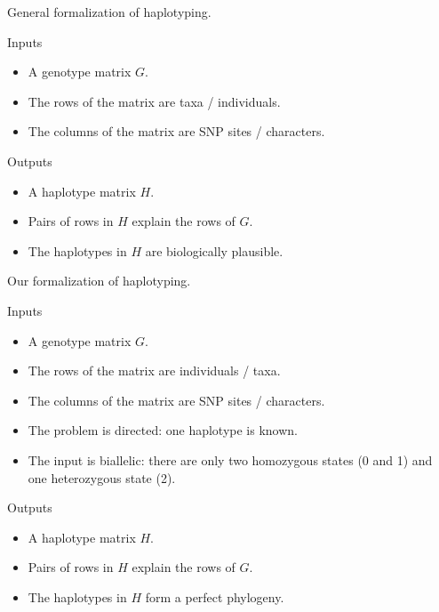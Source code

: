 \documentclass{beamer}
\begin{document}
\begin{frame}[t]{General formalization of haplotyping.}
  \begin{block}{Inputs}
    \begin{itemize}
    \item A \alert{genotype matrix} $G$.
    \item The \alert{rows} of the matrix are \alert{taxa / individuals}.
    \item The \alert{columns} of the matrix are \alert{SNP sites /
        characters}. 
    \end{itemize}
  \end{block}
  \begin{block}{Outputs}
    \begin{itemize}
    \item A \alert{haplotype matrix} $H$.
    \item Pairs of rows in $H$ \alert{explain} the rows of $G$.
    \item The haplotypes in $H$ are \alert{biologically plausible}. 
    \end{itemize}
  \end{block}
\end{frame}


\begin{frame}[t]{Our formalization of haplotyping.}
  \begin{block}{Inputs}
    \begin{itemize}
    \item A genotype matrix $G$.
    \item The rows of the matrix are individuals / taxa.
    \item The columns of the matrix are SNP sites / characters.
    \item<alert@1->
      The problem is directed: one haplotype is known.
    \item<alert@1->
      The input is biallelic: there are only two homozygous
      states (0 and 1) and one heterozygous state (2).
    \end{itemize}
  \end{block}
  \begin{block}{Outputs}
    \begin{itemize}
    \item A haplotype matrix $H$.
    \item Pairs of rows in $H$ explain the rows of $G$.
    \item<alert@1> The haplotypes in $H$ form a perfect phylogeny.
    \end{itemize}
  \end{block}
\end{frame}
\end{document}
